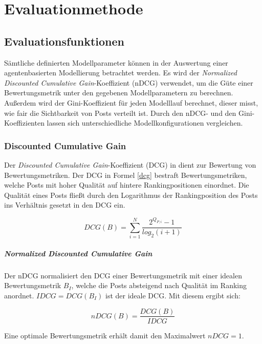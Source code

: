 \chapter{Evaluationmethode}

\section{Evaluationsfunktionen}
Sämtliche definierten Modellparameter können in der Auswertung einer agentenbasierten Modellierung betrachtet werden.
Es wird der \textit{Normalized Discounted Cumulative Gain}-Koeffizient (nDCG) verwendet, um die Güte einer Bewertungsmetrik unter den gegebenen Modellparametern zu berechnen. Außerdem wird der Gini-Koeffizient für jeden Modelllauf berechnet, dieser misst, wie fair die Sichtbarkeit von Posts verteilt ist. Durch den nDCG- und den Gini-Koeffizienten lassen sich unterschiedliche Modellkonfigurationen vergleichen.

\subsection{Discounted Cumulative Gain}

Der \textit{Discounted Cumulative Gain}-Koeffizient (DCG) in \cite{Biega2018405} dient zur Bewertung von Bewertungsmetriken. Der DCG in Formel \ref{dcg} bestraft Bewertungsmetriken, welche Posts mit hoher Qualität auf hintere Rankingpositionen einordnet. Die Qualität eines Posts fließt durch den Logarithmus der Rankingposition des Posts ins Verhältnis gesetzt in den DCG ein.

\begin{equation}
\label{dcg}
DCG(B) = \sum_{i = 1}^{N}\frac{2^{Q_{P,i}}-1}{log_2(i + 1)}
\end{equation} 

\paragraph{Normalized Discounted Cumulative Gain}

Der nDCG normalisiert den DCG einer Bewertungsmetrik mit einer idealen Bewertungsmetrik $B_I$, welche die Posts absteigend nach Qualität im Ranking anordnet. $IDCG = DCG(B_I)$ ist der ideale DCG. Mit diesem ergibt sich:

\begin{equation}
\label{ndcg}
nDCG(B) = \frac{DCG(B)}{IDCG} 
\end{equation}

Eine optimale Bewertungsmetrik erhält damit den Maximalwert $nDCG = 1$.

